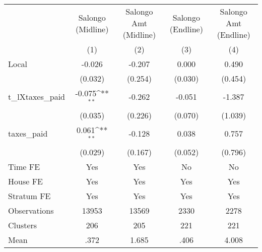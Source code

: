 {
\def\sym#1{\ifmmode^{#1}\else\(^{#1}\)\fi}
\begin{tabular}{l*{4}{c}}
\hline\hline
                &\multicolumn{1}{c}{Salongo (Midline)}&\multicolumn{1}{c}{Salongo Amt (Midline)}&\multicolumn{1}{c}{Salongo (Endline)}&\multicolumn{1}{c}{Salongo Amt (Endline)}\\
                &\multicolumn{1}{c}{(1)}         &\multicolumn{1}{c}{(2)}         &\multicolumn{1}{c}{(3)}         &\multicolumn{1}{c}{(4)}         \\
\hline
Local           &   -0.026         &   -0.207         &    0.000         &    0.490         \\
                &  (0.032)         &  (0.254)         &  (0.030)         &  (0.454)         \\
t\_lXtaxes\_paid  &   -0.075\sym{**} &   -0.262         &   -0.051         &   -1.387         \\
                &  (0.035)         &  (0.226)         &  (0.070)         &  (1.039)         \\
taxes\_paid      &    0.061\sym{**} &   -0.128         &    0.038         &    0.757         \\
                &  (0.029)         &  (0.167)         &  (0.052)         &  (0.796)         \\
Time FE         &      Yes         &      Yes         &       No         &       No         \\
House FE        &      Yes         &      Yes         &      Yes         &      Yes         \\
Stratum FE      &      Yes         &      Yes         &      Yes         &      Yes         \\
\hline
Observations    &    13953         &    13569         &     2330         &     2278         \\
Clusters        &      206         &      205         &      221         &      221         \\
Mean            &     .372         &    1.685         &     .406         &    4.008         \\
\hline\hline
\end{tabular}
}
